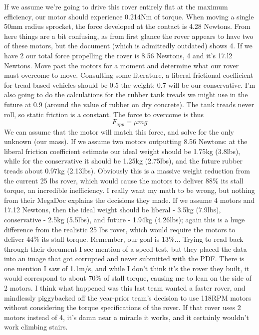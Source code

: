 \documentclass[a4paper, 10pt]{article}
\begin{document}
		If we assume we're going to drive this rover entirely flat at the maximum efficiency, our motor should experience 0.214Nm of torque. When moving a single 50mm radius sprocket, the force developed at the contact is 4.28 Newtons. From here things are a bit confusing, as from first glance the rover appears to have two of these motors, but the document (which is admittedly outdated) shows 4. If we have 2 our total force propelling the rover is 8.56 Newtons, 4 and it's 17.l2 Newtons. Move past the motors for a moment and determine what our rover must overcome to move. Consulting some literature, a liberal frictional coefficient for tread based vehicles should be 0.5 the weight; 0.7 will be our conservative. I'm also going to do the calculations for the rubber tank treads we might use in the future at 0.9 (around the value of rubber on dry concrete). The tank treads never roll, so static friction is a constant. The force to overcome is thus 
		$$F_{app} = \mu mg$$
		We can assume that the motor will match this force, and solve for the only unknown (our mass). If we assume two motors outputting 8.56 Newtons: at the liberal friction coefficient estimate our ideal weight should be 1.75kg (3.8lbs), while for the conservative it should be 1.25kg (2.75lbs), and the future rubber treads about 0.97kg (2.13lbs). Obviously this is a massive weight reduction from the current 25 lbs rover, which would cause the motors to deliver 88\% its stall torque, an incredible inefficiency. I really want my math to be wrong, but nothing from their MegaDoc explains the decisions they made. If we assume 4 motors and 17.12 Newtons, then the ideal weight should be liberal - 3.5kg (7.9lbs), conservative - 2.5kg (5.5lbs), and future - 1.94kg (4.26lbs); again this is a huge difference from the realistic 25 lbs rover, which would require the motors to deliver 44\% its stall torque. Remember, our goal is 13\%... Trying to read back through their document I see mention of a speed test, but they placed the data into an image that got corrupted and never submitted with the PDF. There is one mention I saw of 1.1m/s, and while I don't think it's the rover they built, it would correspond to about 70\% of stall torque, causing me to lean on the side of 2 motors. I think what happened was this last team wanted a faster rover, and mindlessly piggybacked off the year-prior team's decision to use 118RPM motors without considering the torque specifications of the rover. If that rover uses 2 motors instead of 4, it's damn near a miracle it works, and it certainly wouldn't work climbing stairs. 
		
\end{document}
